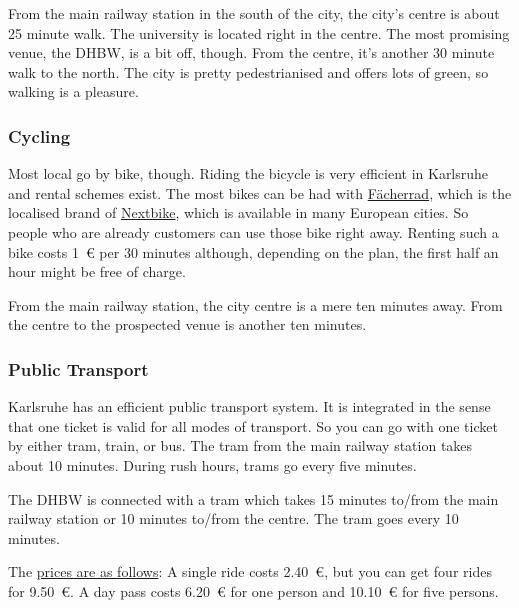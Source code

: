 From the main railway station in the south of the city,
the city's centre is about 25 minute walk.
The university is located right in the centre.
The most promising venue, the DHBW, is a bit off, though.
From the centre, it's another 30 minute walk to the north.
The city is pretty pedestrianised and offers lots of green,
so walking is a pleasure.

\subsubsection{Cycling}
Most local go by bike, though.
Riding the bicycle is very efficient in Karlsruhe and
rental schemes exist.
The most bikes can be had with \href{http://www.faecherrad.de/de/karlsruhe/preise/}{Fächerrad},
which is the localised brand of \href{http://www.nextbike.de/de/news/das-karlsruher-leihfahrrad-hei%C3%9Ft-f%C3%A4cherrad/}{Nextbike},
which is available in many European cities.
So people who are already customers can use those bike right away.
Renting such a bike costs \SI{1}{\euro} per 30 minutes although,
depending on the plan, the first half an hour might be free of charge.

From the main railway station, the city centre is a mere ten minutes 
away.
From the centre to the prospected venue is another ten minutes.



\subsubsection{Public Transport}

Karlsruhe has an efficient public transport system.
It is integrated in the sense that one ticket is valid
for all modes of transport.
So you can go with one ticket by either tram, train, or bus.
The tram from the main railway station takes about 10 minutes.
During rush hours, trams go every five minutes.

The DHBW is connected with a tram which takes 15 minutes to/from the 
main railway station or 10 minutes to/from the centre.
The tram goes every 10 minutes.

The 
\href{http://www.kvv.de/fahrkarten/fahrkarten-preise/einzelfahrkarten.html}%
{prices are as follows}:
A single ride costs \SI{2.40}{\euro}, but you can get four rides for \SI{9.50}{\euro}.
A day pass costs \SI{6.20}{\euro} for one person and \SI{10.10}{\euro} for five 
persons.

\newpage
